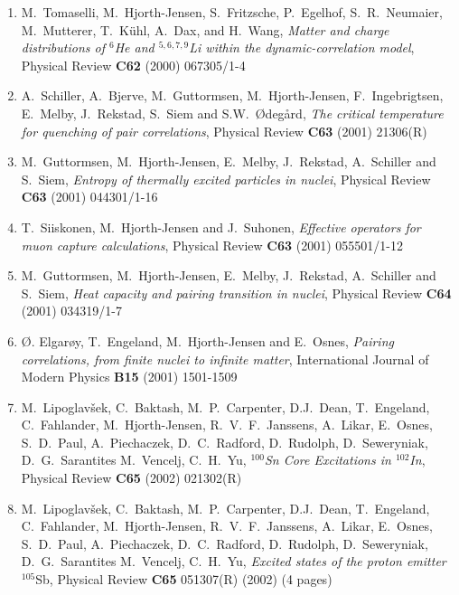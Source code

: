 \begin{enumerate}
\item 
      M.~Tomaselli, M.~Hjorth-Jensen, S.~Fritzsche, P.~Egelhof, 
      S.~R.~Neumaier, M.~Mutterer, T.~K\"uhl, A.~Dax, and H.~Wang,
      {\em Matter and charge distributions of $^6$He and $^{5,6,7,9}$Li
           within the dynamic-correlation model},  
       Physical Review {\bf C62} (2000) 067305/1-4
\item  A.\ Schiller, A.\ Bjerve, M.\ Guttormsen, M.\ Hjorth-Jensen,
       F.\ Ingebrigtsen, E.\ Melby,  J.\ Rekstad,  S.\ Siem and
       S.W.\ \O deg\aa rd,  
       {\em The critical temperature for quenching of pair correlations},
       Physical Review {\bf C63} (2001) 21306(R)
\item  M.\ Guttormsen, M.\ Hjorth-Jensen, E.\ Melby,  
       J.\ Rekstad,  A.\ Schiller and S.\ Siem,
       {\em Entropy of thermally excited particles in nuclei},
       Physical Review {\bf C63} (2001) 044301/1-16
\item T.\ Siiskonen, M.\ Hjorth-Jensen and J.\ Suhonen, {\em  Effective
      operators for muon capture calculations}, Physical Review {\bf C63}
      (2001) 055501/1-12 

\item M.\ Guttormsen, M.\ Hjorth-Jensen, E.\ Melby,  
       J.\ Rekstad,  A.\ Schiller and S.\ Siem,
       {\em Heat capacity and pairing transition in nuclei},
       Physical Review {\bf C64} (2001) 034319/1-7
\item
    \O. Elgar\o y, T.\ Engeland, M.\ Hjorth-Jensen and E.\ Osnes,
    {\em Pairing correlations, from finite nuclei to infinite matter},
    International Journal of Modern Physics {\bf B15} (2001) 1501-1509

\item 
M.~Lipoglav\v{s}ek, C.~Baktash,
M.~P.~Carpenter, D.J.~Dean, T.~Engeland, C.~Fahlander,
M.~Hjorth-Jensen, R.~V.~F.~Janssens, A.~Likar,
E.~Osnes, S.~D.~Paul, A.~Piechaczek, D.~C.~Radford,
D.~Rudolph, D.~Seweryniak, D.~G.~Sarantites M.~Vencelj, C.~H.~Yu,
{\em $^{100}$Sn Core Excitations in $^{102}$In}, 
Physical Review {\bf C65} (2002) 021302(R) 


\item 
M.~Lipoglav\v{s}ek, C.~Baktash,
M.~P.~Carpenter, D.J.~Dean, T.~Engeland, C.~Fahlander,
M.~Hjorth-Jensen, R.~V.~F.~Janssens, A.~Likar,
E.~Osnes, S.~D.~Paul, A.~Piechaczek, D.~C.~Radford,
D.~Rudolph, D.~Seweryniak, D.~G.~Sarantites M.~Vencelj, C.~H.~Yu,
{\em Excited states of the proton emitter} $^{105}$Sb, 
Physical Review {\bf C65} 051307(R) (2002) (4 pages)



\end{enumerate}
